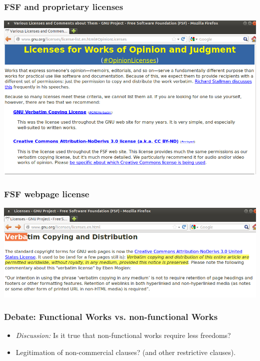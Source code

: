 \documentclass{beamer}
\begin{document}

\begin{frame}
\frametitle{FSF and proprietary licenses}

\begin{center}
\includegraphics[scale=0.32,clip=true]{figs/fsf-privative-licenses.png}
\end{center}

\end{frame}


\begin{frame}
\frametitle{FSF webpage license}

\begin{center}
\includegraphics[scale=0.32,clip=true]{figs/fsf-web-privative-license.png}
\end{center}

\end{frame}


\begin{frame}
\frametitle{Debate: Functional Works vs. non-functional Works}
\begin{itemize}
\item \textit{Discussion:} Is it true that non-functional works require \alert{less} freedoms? \\

\pause

\item Legitimation of non-commercial clauses? (and other restrictive clauses).
\end{itemize}                                                 

\end{frame}
\end{document}
